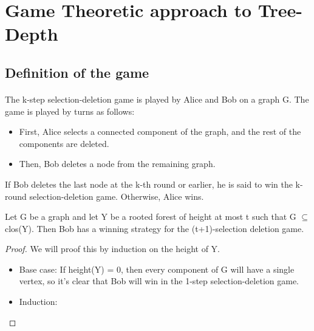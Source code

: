 \section{Game Theoretic approach to Tree-Depth}

\subsection{Definition of the game}
\paragraph{}
The k-step selection-deletion game is played by Alice and Bob on a graph G. The game is played by turns as follows:
\begin{itemize}
  \item First, Alice selects a connected component of the graph, and the rest of the components are deleted.
  \item Then, Bob deletes a node from the remaining graph.
\end{itemize}

If Bob deletes the last node at the k-th round or earlier, he is said to win the k-round selection-deletion game. Otherwise, Alice wins.

\begin{lemma}
Let G be a graph and let Y be a rooted forest of height at most t such that G $\subseteq$ clos(Y). Then Bob has a winning strategy for the (t+1)-selection deletion game.
\end{lemma}
\begin{proof}
We will proof this by induction on the height of Y.
\begin{itemize}
  \item Base case: If height(Y) = 0, then every component of G will have a single vertex, so it's clear that Bob will win in the 1-step selection-deletion game.
  \item Induction: 
\end{itemize}
\end{proof}